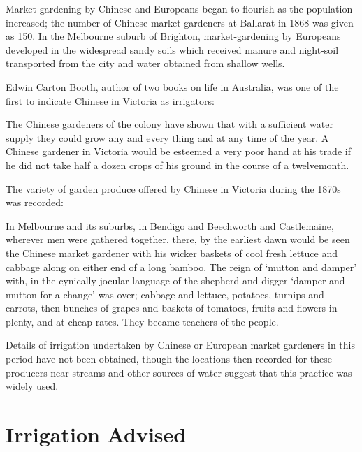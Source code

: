 Market-gardening  by Chinese and
Europeans began to flourish as the population
increased; the number of Chinese market-gardeners at Ballarat
 in 1868 was given as 150.  In the Melbourne
suburb of Brighton,   market-gardening by
Europeans developed in the widespread sandy soils which received
manure and night-soil transported from the city and water obtained
from shallow wells.

Edwin Carton Booth,  author of two books on life
in Australia, was one of the first to indicate Chinese in Victoria as
irrigators:
\begin{Quote}
	The Chinese gardeners of the colony have shown that with a
	sufficient water supply they could grow any and every thing
	and at any time of the year. A Chinese gardener in Victoria
	would be esteemed a very poor hand at his trade if he did not
	take half a dozen crops of his ground in the course of a
	twelvemonth.
\end{Quote}

The variety of garden produce offered by Chinese in
Victoria during the 1870s was record\-ed:
\begin{Quote}
	In Melbourne and its suburbs, in Bendigo and Beechworth and
	Castlemaine, wherever men were gathered together, there, by
	the earliest dawn would be seen the Chinese market gardener
	with his wicker baskets of cool fresh lettuce and cabbage
	along on either end of a long bamboo.  The reign of `mutton
	and damper' with, in the cynically jocular language of the
	shepherd and digger `damper and mutton for a change' was over;
	cabbage and lettuce, potatoes, turnips and carrots, then
	bunches of grapes and baskets of tomatoes, fruits
	and flowers in plenty, and at cheap rates. They became
	teachers of the people.
\end{Quote}

Details of irrigation undertaken by Chinese or
European market gardeners in this period have not
been obtained, though the locations then recorded for these producers
near streams and other sources of water suggest that this practice was
widely used.

\section*{Irrigation Advised}

